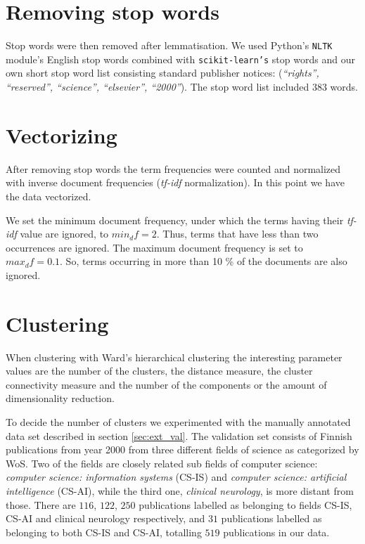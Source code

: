 \section{Removing stop words}
Stop words were then removed after lemmatisation. We used Python's
\texttt{NLTK} module's English stop words combined with 
\texttt{scikit-learn's} stop words and our own short stop word 
list consisting standard publisher notices: (\emph{``rights'', 
``reserved'', ``science'', ``elsevier'', ``2000''}). The stop word 
list included $383$ words.


\section{Vectorizing}
After removing stop words the term frequencies were counted and 
normalized with inverse document frequencies (\emph{tf-idf} 
normalization). 
In this point we have the data vectorized.

We set the minimum document frequency, under which the terms 
having their \emph{tf-idf} value are ignored, to $min_df=2$. 
Thus, terms that have less than two occurrences are ignored. The maximum 
document frequency is set to $max_df=0.1$. So, terms 
occurring in more than 10 \% of the documents are also ignored.



\section{Clustering}
\label{sec:4clustering}
When clustering with Ward's hierarchical clustering the 
interesting parameter values are the number of the clusters, 
the distance measure, the cluster connectivity measure and the 
number of the components or the amount of dimensionality 
reduction. 

To decide the number of clusters we experimented with the manually 
annotated data set described in section \ref{sec:ext_val}.
The validation set consists of Finnish publications from year 2000
from three different fields of science as categorized by WoS.
Two of the fields are closely related sub fields of computer
science: \emph{computer science: information systems} (CS-IS) and 
\emph{computer science: 
artificial intelligence} (CS-AI), while the third one, 
\emph{clinical neurology}, is more distant from those. There are 
$116$, $122$, $250$ publications labelled as belonging to fields 
CS-IS, CS-AI and clinical neurology respectively, and $31$ 
publications labelled as belonging to both CS-IS and CS-AI, 
totalling $519$ publications in our data.

